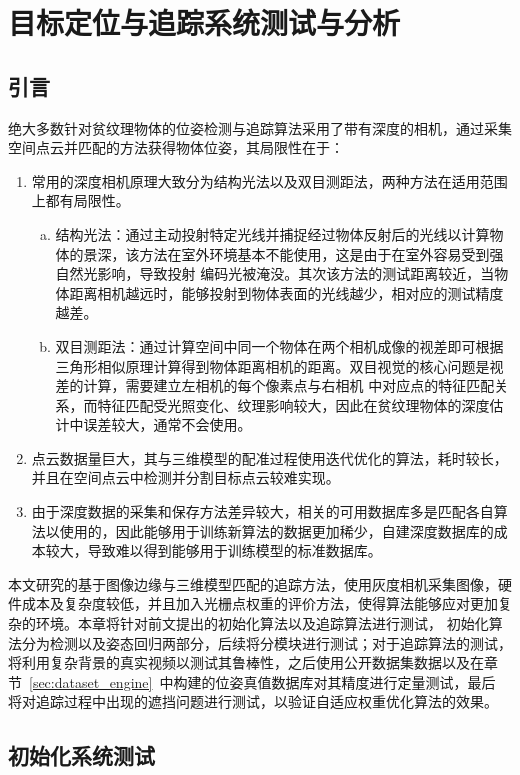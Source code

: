 \chapter{目标定位与追踪系统测试与分析}
\label{cha:test}
\section{引言}
\label{sec:test:intro}
绝大多数针对贫纹理物体的位姿检测与追踪算法采用了带有深度的相机，通过采集空间点云并匹配的方法获得物体位姿，其局限性在于：
\begin{enumerate}[(1)] 
    \item 常用的深度相机原理大致分为结构光法以及双目测距法，两种方法在适用范围上都有局限性。
    \begin{enumerate}[(a)] 
        \item 结构光法：通过主动投射特定光线并捕捉经过物体反射后的光线以计算物体的景深，该方法在室外环境基本不能使用，这是由于在室外容易受到强自然光影响，导致投射
        编码光被淹没。其次该方法的测试距离较近，当物体距离相机越远时，能够投射到物体表面的光线越少，相对应的测试精度越差。
        \item 双目测距法：通过计算空间中同一个物体在两个相机成像的视差即可根据三角形相似原理计算得到物体距离相机的距离。双目视觉的核心问题是视差的计算，需要建立左相机的每个像素点与右相机
        中对应点的特征匹配关系，而特征匹配受光照变化、纹理影响较大，因此在贫纹理物体的深度估计中误差较大，通常不会使用。
    \end{enumerate}
    \item 点云数据量巨大，其与三维模型的配准过程使用迭代优化的算法，耗时较长，并且在空间点云中检测并分割目标点云较难实现。
    \item 由于深度数据的采集和保存方法差异较大，相关的可用数据库多是匹配各自算法以使用的，因此能够用于训练新算法的数据更加稀少，自建深度数据库的成本较大，导致难以得到能够用于训练模型的标准数据库。
    \end{enumerate}

本文研究的基于图像边缘与三维模型匹配的追踪方法，使用灰度相机采集图像，硬件成本及复杂度较低，并且加入光栅点权重的评价方法，使得算法能够应对更加复杂的环境。本章将针对前文提出的初始化算法以及追踪算法进行测试，
初始化算法分为检测以及姿态回归两部分，后续将分模块进行测试；对于追踪算法的测试，将利用复杂背景的真实视频以测试其鲁棒性，之后使用公开数据集数据以及在章节~\ref{sec:dataset_engine}~中构建的位姿真值数据库对其精度进行定量测试，最后
将对追踪过程中出现的遮挡问题进行测试，以验证自适应权重优化算法的效果。

\section{初始化系统测试}
\label{sec:detect_pose_test}
